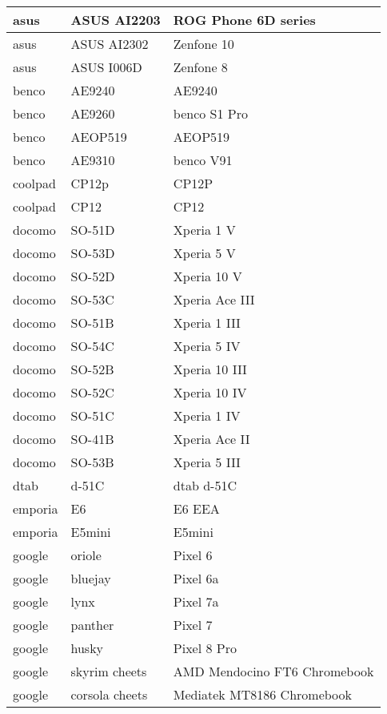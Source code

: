 \begin{tabularx}{\linewidth}{|l|X|X|}
        asus & ASUS AI2203 & ROG Phone 6D series \\ \hline
        asus & ASUS AI2302 & Zenfone 10 \\ \hline
        asus & ASUS I006D & Zenfone 8 \\ \hline
        benco & AE9240 & AE9240 \\ \hline
        benco & AE9260 & benco S1 Pro \\ \hline
        benco & AEOP519 & AEOP519 \\ \hline
        benco & AE9310 & benco V91 \\ \hline
        coolpad & CP12p & CP12P \\ \hline
        coolpad & CP12 & CP12 \\ \hline
        docomo & SO-51D & Xperia 1 V \\ \hline
        docomo & SO-53D & Xperia 5 V \\ \hline
        docomo & SO-52D & Xperia 10 V \\ \hline
        docomo & SO-53C & Xperia Ace III \\ \hline
        docomo & SO-51B & Xperia 1 III \\ \hline
        docomo & SO-54C & Xperia 5 IV \\ \hline
        docomo & SO-52B & Xperia 10 III \\ \hline
        docomo & SO-52C & Xperia 10 IV \\ \hline
        docomo & SO-51C & Xperia 1 IV \\ \hline
        docomo & SO-41B & Xperia Ace II \\ \hline
        docomo & SO-53B & Xperia 5 III \\ \hline
        dtab & d-51C & dtab d-51C \\ \hline
        emporia & E6 & E6 EEA \\ \hline
        emporia & E5mini & E5mini \\ \hline
        google & oriole & Pixel 6 \\ \hline
        google & bluejay & Pixel 6a \\ \hline
        google & lynx & Pixel 7a \\ \hline
        google & panther & Pixel 7 \\ \hline
        google & husky & Pixel 8 Pro \\ \hline
        google & skyrim cheets & AMD Mendocino FT6 Chromebook \\ \hline
        google & corsola cheets & Mediatek MT8186 Chromebook \\ \hline

\end{tabularx}
